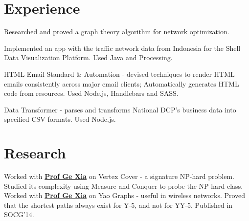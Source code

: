 \documentclass{deedy-resume-openfont}
\begin{document}
\hfill
\begin{minipage}[t]{0.66\textwidth} 


\section{Experience}
\vspace{\topsep} %
\begin{tightemize}
\item Researched and proved a graph theory algorithm for network optimization.
\item Implemented an app with the traffic network data from Indonesia for the Shell Data Visualization Platform. Used Java and Processing.
\end{tightemize}
\sectionsep

\begin{tightemize}
\item HTML Email Standard \& Automation - devised techniques to render HTML emails consistently across major email clients; Automatically generates HTML code from resources. Used Node.js, Handlebars and SASS.
\item Data Transformer - parses and transforms National DCP's business data into specified CSV formats. Used Node.js.
\end{tightemize}
\sectionsep



\section{Research}
Worked with \textbf{\href{http://www.cs.lafayette.edu/~gexia/}{Prof Ge Xia}} on Vertex Cover - a signature NP-hard problem. Studied its complexity using Measure and Conquer to probe the NP-hard class.\\
\sectionsep
{}
Worked with \textbf{\href{http://www.cs.lafayette.edu/~gexia/}{Prof Ge Xia}} on Yao Graphs - useful in wireless networks. Proved that the shortest paths always exist for Y-5, and not for YY-5. Published in SOCG'14.
\sectionsep



\end{minipage}
\end{document}
